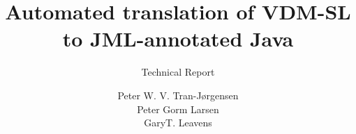 \documentclass{ase}
\title{Automated translation of VDM-SL to JML-annotated Java}
\subtitle{Technical Report}
\author{Peter W. V. Tran-J\o{}rgensen\\Peter Gorm
  Larsen\\GaryT. Leavens}
\begin{document}
\maketitle
\frontmatter
\asetableofcontents

\mainmatter




\begin{appendices}
  
  
  
\end{appendices}



\end{document}
